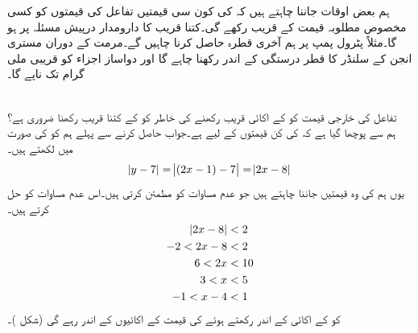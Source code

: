ہم بعض اوقات جاننا چاہتے ہیں کہ  کی کون سی قیمتیں  تفاعل  کی قیمتوں کو کسی مخصوص مطلوبہ قیمت کے قریب رکھے گی۔کتنا قریب کا دارومدار درپیش مسئلہ پر ہو گا۔مثلاً پٹرول پمپ پر ہم آخری قطرہ حاصل کرنا چاہیں گے۔مرمت کے دوران  مستری انجن  کے   سلنڈر کا قطر  درستگی کے اندر رکھنا چاہے گا اور دواساز اجزاء کو قریبی ملی گرام تک ناپے گا۔

\\
تفاعل  کی  خارجی قیمت کو  کے  اکائی قریب رکھنے کی خاطر  کو  کے کتنا قریب رکھنا ضروری ہے؟\\
ہم سے پوچھا گیا ہے کہ  کی کن قیمتوں کے لیے  ہے۔جواب حاصل کرنے سے پہلے ہم   کو  کی صورت میں لکھتے ہیں۔
\begin{align*}
\abs{y-7}=\abs{(2x-1)-7}=\abs{2x-8}
\end{align*}
یوں ہم  کی وہ قیمتیں جاننا چاہتے ہیں جو عدم مساوات  کو مطمئن کرتی  ہیں۔اس عدم مساوات کو حل کرتے ہیں۔
\begin{align*}
\abs{2x-8}&<2\\
-2<2x-8&<2\\
6<2x&<10\\
3<x&<5\\
-1<x-4&<1
\end{align*}
 کو  کے  اکائی کے اندر  رکھتے ہوئے  کی قیمت  کے  اکائیوں کے اندر رہے گی (شکل )۔
